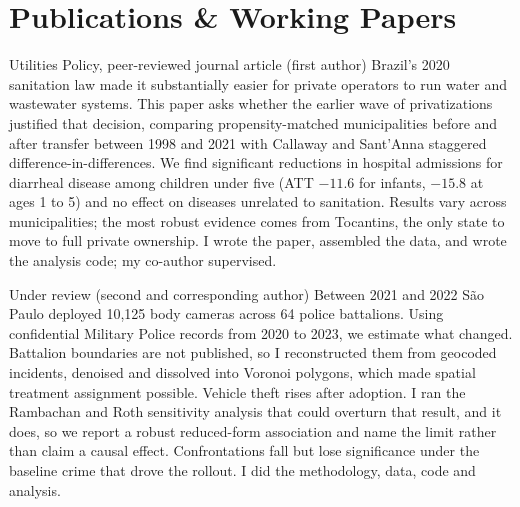 \section{Publications \& Working Papers}

      {Utilities Policy, peer-reviewed journal article \textnormal{(first author)}}
      {Brazil's 2020 sanitation law made it substantially easier for private operators to run water and wastewater systems. This paper asks whether the earlier wave of privatizations justified that decision, comparing propensity-matched municipalities before and after transfer between 1998 and 2021 with Callaway and Sant'Anna staggered difference-in-differences. We find significant reductions in hospital admissions for diarrheal disease among children under five (ATT $-11.6$ for infants, $-15.8$ at ages 1 to 5) and no effect on diseases unrelated to sanitation. Results vary across municipalities; the most robust evidence comes from Tocantins, the only state to move to full private ownership. I wrote the paper, assembled the data, and wrote the analysis code; my co-author supervised.}

      {Under review \textnormal{(second and corresponding author)}}
      {Between 2021 and 2022 São Paulo deployed 10,125 body cameras across 64 police battalions. Using confidential Military Police records from 2020 to 2023, we estimate what changed. Battalion boundaries are not published, so I reconstructed them from geocoded incidents, denoised and dissolved into Voronoi polygons, which made spatial treatment assignment possible. Vehicle theft rises after adoption. I ran the Rambachan and Roth sensitivity analysis that could overturn that result, and it does, so we report a robust reduced-form association and name the limit rather than claim a causal effect. Confrontations fall but lose significance under the baseline crime that drove the rollout. I did the methodology, data, code and analysis.}
